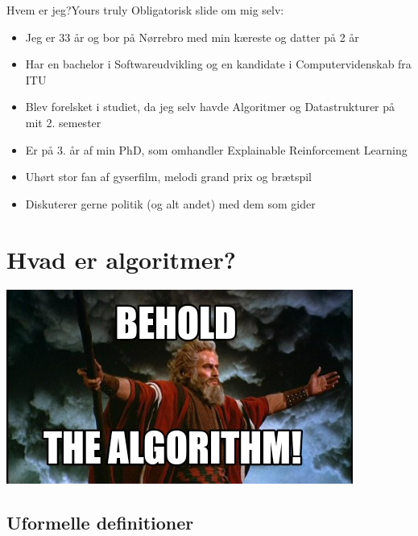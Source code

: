 \documentclass[aspectratio=1610]{beamer}
\begin{document}
\begin{frame}{Hvem er jeg?}{Yours truly}
    Obligatorisk slide om mig selv:

    \begin{itemize}[<+->]
        \item Jeg er 33 år og bor på Nørrebro med min kæreste og datter på 2 år
        \item Har en bachelor i Softwareudvikling og en kandidate i
            Computervidenskab fra ITU
        \item Blev forelsket i studiet, da jeg selv havde Algoritmer og
            Datastrukturer på mit 2. semester
        \item Er på 3. år af min PhD, som omhandler Explainable Reinforcement
            Learning
        \item Uhørt stor fan af gyserfilm, melodi grand prix og brætspil
        \item Diskuterer gerne politik (og alt andet) med dem som gider
    \end{itemize}
\end{frame}



\section{Hvad er algoritmer?}%

\begin{frame}{}{}
    \includegraphics[width=\textwidth]{behold-the-algorithm}
\end{frame}



\subsection{Uformelle definitioner}
\end{document}
